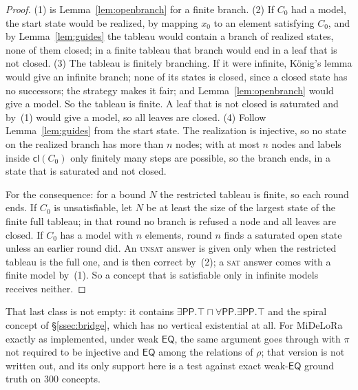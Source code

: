 \documentclass[11pt]{article}
\newcommand{\PP}{\mathsf{PP}}
\newcommand{\EQ}{\mathsf{EQ}}
\newcommand{\cl}{\ensuremath{\mathsf{cl}}}
\theoremstyle{plain}
\theoremstyle{definition}
\begin{document}
\begin{proof}
(1) is Lemma~\ref{lem:openbranch} for a finite branch. (2) If $C_0$ had a
model, the start state would be realized, by mapping $x_0$ to an element
satisfying $C_0$, and by Lemma~\ref{lem:guides} the tableau would contain a
branch of realized states, none of them closed; in a finite tableau that
branch would end in a leaf that is not closed. (3) The tableau is finitely
branching. If it were infinite, K\"onig's lemma would give an infinite branch;
none of its states is closed, since a closed state has no successors; the
strategy makes it fair; and Lemma~\ref{lem:openbranch} would give a model. So
the tableau is finite. A leaf that is not closed is saturated and by~(1) would
give a model, so all leaves are closed. (4) Follow Lemma~\ref{lem:guides} from
the start state. The realization is injective, so no state on the realized
branch has more than $n$ nodes; with at most $n$ nodes and labels inside
$\cl(C_0)$ only finitely many steps are possible, so the branch ends, in a
state that is saturated and not closed.

For the consequence: for a bound $N$ the restricted tableau is finite, so
each round ends. If $C_0$ is unsatisfiable, let $N$ be at least the size of
the largest state of the finite full tableau; in that round no branch is
refused a node and all leaves are closed. If $C_0$ has a model with $n$
elements, round $n$ finds a saturated open state unless an earlier round did.
An \textsc{unsat} answer is given only when the restricted tableau is the
full one, and is then correct by~(2); a \textsc{sat} answer comes with a
finite model by~(1). So a concept that is satisfiable only in infinite models
receives neither.
\end{proof}

That last class is not empty: it contains $\exists\PP.\top\sqcap
\forall\PP.\exists\PP.\top$ and the spiral concept of \S\ref{ssec:bridge},
which has no vertical existential at all. For MiDeLoRa exactly as implemented,
under weak $\EQ$, the same argument goes through with $\pi$ not required to be
injective and $\EQ$ among the relations of $\rho$; that version is not written
out, and its only support here is a test against exact weak-$\EQ$ ground truth
on $300$ concepts.
\end{document}

